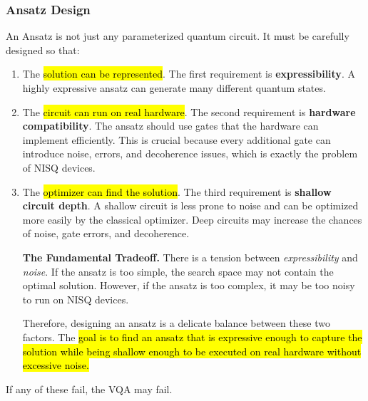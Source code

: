\subsubsection{Ansatz Design}\label{sec:ansatz-design}

An Ansatz is not just any parameterized quantum circuit. It must be carefully designed so that:
\begin{enumerate}
    \item The \hl{solution can be represented}. The first requirement is \textbf{expressibility}. A highly expressive ansatz can generate many different quantum states.
    \item The \hl{circuit can run on real hardware}. The second requirement is \textbf{hardware compatibility}. The ansatz should use gates that the hardware can implement efficiently. This is crucial because every additional gate can introduce noise, errors, and decoherence issues, which is exactly the problem of NISQ devices.
    \item The \hl{optimizer can find the solution}. The third requirement is \textbf{shallow circuit depth}. A shallow circuit is less prone to noise and can be optimized more easily by the classical optimizer. Deep circuits may increase the chances of noise, gate errors, and decoherence.
    
    \textcolor{DarkOrange3}{ \textbf{The Fundamental Tradeoff.}} There is a tension between \emph{expressibility} and \emph{noise}. If the ansatz is too simple, the search space may not contain the optimal solution. However, if the ansatz is too complex, it may be too noisy to run on NISQ devices.
    
    Therefore, designing an ansatz is a delicate balance between these two factors. The \hl{goal is to find an ansatz that is expressive enough to capture the solution while being shallow enough to be executed on real hardware without excessive noise.}
\end{enumerate}
If any of these fail, the VQA may fail.

